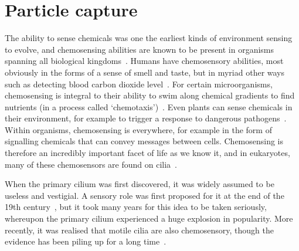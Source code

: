 \setchapterpreamble[u]{\optmargintoc}
\chapter{Particle capture}

The ability to sense chemicals was one the earliest kinds of environment sensing to evolve, and chemosensing abilities are known to be present in organisms spanning all biological kingdoms~. Humans have chemosensory abilities, most obviously in the forms of a sense of smell and taste, but in myriad other ways such as detecting blood carbon dioxide level~. For certain microorganisms, chemosensing is integral to their ability to swim along chemical gradients to find nutrients (in a process called `chemotaxis')~. Even plants can sense chemicals in their environment, for example to trigger a response to dangerous pathogens~. Within organisms, chemosensing is everywhere, for example in the form of signalling chemicals that can convey messages between cells. Chemosensing is therefore an incredibly important facet of life as we know it, and in eukaryotes, many of these chemosensors are found on cilia~.



When the primary cilium was first discovered, it was widely assumed to be useless and vestigial. A sensory role was first proposed for it at the end of the 19th century~, but it took many years for this idea to be taken seriously, whereupon the primary cilium experienced a huge explosion in popularity. More recently, it was realised that motile cilia are also chemosensory, though the evidence has been piling up for a long time~\cite{bloodgood_sensory_2010}.

